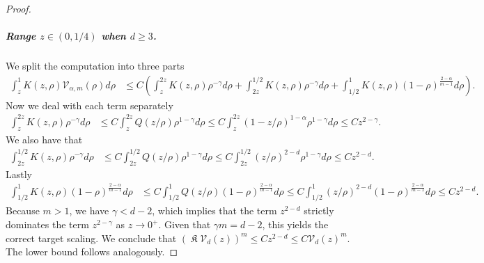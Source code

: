 \documentclass[a4paper]{article}
\theoremstyle{definition}
\DeclareMathOperator{\fixedpoint}{\mathfrak K}
\begin{document}
\begin{proof}
\subparagraph{Range $z \in (0,1/4)$ when $d \ge 3$.}
We split the computation into three parts
\begin{align*}
  \int_z^1 K(z,\rho) \mathcal V_{\alpha,m} (\rho) d \rho
  & \le C\left( \int_z^{2z}  K(z, \rho) \rho^{-\gamma} d \rho
    + \int_{2z}^{1/2}   K(z, \rho) \rho^{-\gamma} d \rho
  + \int_{1/2}^{1}  K(z, \rho) (1-\rho)^{\frac{2-\alpha}{m-1}} d \rho \right).
\end{align*}
Now we deal with each term separately
\begin{align*}
  \int_z^{2z}  K(z, \rho) \rho^{-\gamma} d \rho
  & \le C \int_z^{2z}  Q(z/ \rho) \rho^{1-\gamma} d \rho
  \le C\int_z^{2z}  (1 - z/\rho)^{1-\alpha}  \rho^{1-\gamma} d \rho
  \le C z^{2-\gamma}.
\end{align*}
We also have that
\begin{align*}
  \int_{2z}^{1/2}   K(z, \rho) \rho^{-\gamma} d \rho
  & \le C \int_{2z}^{1/2}   Q(z/\rho) \rho^{1-\gamma} d \rho
  \le C \int_{2z}^{1/2}(z/\rho)^{2-d}\rho^{1-\gamma} d \rho
  \le C z^{2-d} .
\end{align*}
Lastly
\begin{align*}
  \int_{1/2}^{1}  K(z, \rho) (1-\rho)^{\frac{2-\alpha}{m-1}} d \rho
  & \le C \int_{1/2}^{1}  Q(z/\rho) (1-\rho)^{\frac{2-\alpha}{m-1}} d \rho
  \le C \int_{1/2}^{1} (z/\rho)^{2-d} (1-\rho)^{\frac{2-\alpha}{m-1}} d \rho
  \le Cz^{2-d}.
\end{align*}
Because $m > 1$, we have $\gamma < d-2$, which implies that the term $z^{2-d}$ strictly dominates the term $z^{2-\gamma}$ as $z \to 0^+$. Given that $\gamma m = d-2$, this yields the correct target scaling. We conclude that $(\fixedpoint\mathcal{V}_d(z))^m \le C z^{2-d} \le C \mathcal{V}_d(z)^m$. The lower bound follows analogously.


\end{proof}
\end{document}
